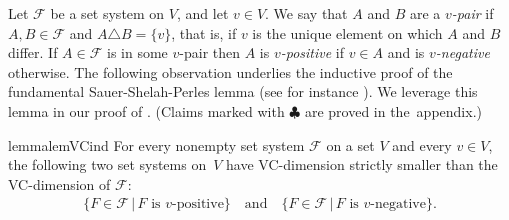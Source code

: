 \documentclass[11pt]{article}
\newtheorem{theorem}{Theorem}
\theoremstyle{definition}
\newtheorem{definition}[theorem]{Definition}
\newcommand{\CC}{{\mathscr C}}
\newcommand{\N}{\mathbb{N}}
\newcommand{\RMM}[1]{\begin{RMMin}#1\end{RMMin}}
\newcommand{\inAppendix}{$\clubsuit$}%
\renewcommand{\le}{\leqslant}
\renewcommand{\subset}{\subseteq}
\newcommand{\set}[1]{\{#1\}}
\newcommand{\setof}[2]{\set{#1 \,|\, #2 }}
\renewcommand{\cal}{\mathcal}
\begin{document}


Let $\cal F$ be a set system on $V$, and let $v\in V$.
We say that $A$ and $B$ are a \emph{$v$-pair}
if $A,B\in\cal F$ and $A\triangle B=\set{v}$, that is, if $v$ is the unique element on which $A$ and $B$ differ.
If $A\in\cal F$ is in some $v$-pair then $A$ is \emph{$v$-positive} 
if $v\in A$ and is \emph{$v$-negative} otherwise. The following observation  underlies the inductive proof of the fundamental Sauer-Shelah-Perles lemma (see for instance \cite[Lemma~5.9]{discrepancy}). We leverage this lemma in our proof of . (Claims marked with \inAppendix{} are proved in the~appendix.)

\begin{restatable}[\inAppendix]{lemma}{lemVCind}\label{lem:VC-induction}
  For every nonempty set system $\cal F$ on a set $V$ and every  $v\in V$,
  the following two set systems on~$V$ 
  have VC-dimension strictly smaller than the VC-dimension of $\cal F$:
  \begin{align*}
    \setof{F\in\cal F}{\text{$F$ is $v$-positive}}
    \quad
    \text{and}
    \quad
    \setof{F\in\cal F}{\text{$F$ is $v$-negative}}.
  \end{align*}  
\end{restatable}


\newcommand{\hamming}{\mathrm{Hamming}}
  
\end{document}
